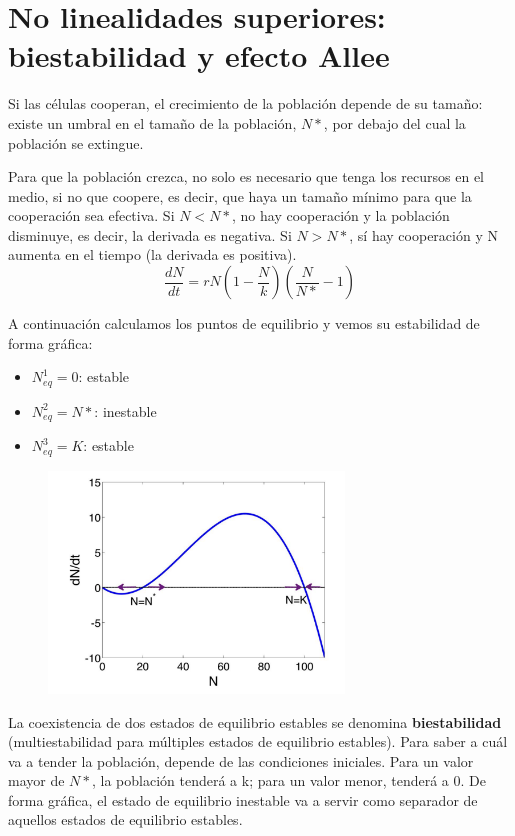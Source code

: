 \section{No linealidades superiores: biestabilidad y efecto Allee}
Si las células cooperan, el crecimiento de la población depende de su tamaño: existe un umbral en el tamaño de la población, $N*$, por debajo del cual la población se extingue. 

Para que la población crezca, no solo es necesario que tenga los recursos en el medio, si no que coopere, es decir, que haya un tamaño mínimo para que la cooperación sea efectiva. Si $N < N*$, no hay cooperación y la población disminuye, es decir, la derivada es negativa. Si $N > N*$, sí hay cooperación y N aumenta en el tiempo (la derivada es positiva).
$$\frac{dN}{dt} = rN (1 - \frac{N}{k}) (\frac{N}{N*} - 1)$$

A continuación calculamos los puntos de equilibrio y vemos su estabilidad de forma gráfica:
\begin{itemize}
\item $N^1_{eq} = 0$: estable
\item $N^2_{eq} = N*$: inestable
\item $N^3_{eq} = K$: estable
\end{itemize}

\begin{figure}[h]
\centering
\includegraphics[width = 0.7\textwidth]{figs/bistability-graph.png}
\end{figure}

La coexistencia de dos estados de equilibrio estables se denomina \textbf{biestabilidad} (multiestabilidad para múltiples estados de equilibrio estables). Para saber a cuál va a tender la población, depende de las condiciones iniciales. Para un valor mayor de $N*$, la población tenderá a k; para un valor menor, tenderá a 0. De forma gráfica, el estado de equilibrio inestable va a servir como separador de aquellos estados de equilibrio estables. 

